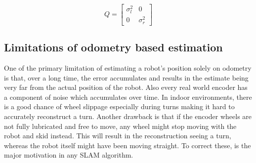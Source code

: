 \begin{equation}
\label{eq:Enc_9}
Q = 
\begin{bmatrix}
\sigma_l^2 & 0\\
0 & \sigma_r^2
\end{bmatrix}
\end{equation}

\subsection{Limitations of odometry based estimation}

One of the primary limitation of estimating a robot's position solely on odometry is that, over a long time, the error accumulates and results in the estimate being very far from the actual position of the robot. Also every real world encoder has a component of noise which accumulates over time. In indoor environments, there is a good chance of wheel slippage especially during turns making it hard to accurately reconstruct a turn. Another drawback is that if the encoder wheels are not fully lubricated and free to move, any wheel might stop moving with the robot and skid instead. This will result in the reconstruction seeing a turn, whereas the robot itself might have been moving straight. To correct these, is the major motivation in any SLAM algorithm. 
